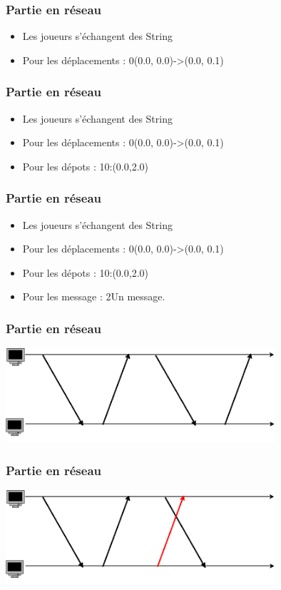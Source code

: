 \documentclass{beamer}
\begin{document}
    \begin{frame}
        \frametitle{Partie en r\'eseau}
        \begin{itemize}
        \item Les joueurs s'\'echangent des String
        \item Pour les d\'eplacements : 0(0.0, 0.0)->(0.0, 0.1)
        \end{itemize}
    \end{frame}
    \begin{frame}
        \frametitle{Partie en r\'eseau}
        \begin{itemize}
        \item Les joueurs s'\'echangent des String
        \item Pour les d\'eplacements : 0(0.0, 0.0)->(0.0, 0.1)
        \item Pour les d\'epots : 10:(0.0,2.0)
        \end{itemize}
    \end{frame}
    \begin{frame}
        \frametitle{Partie en r\'eseau}
        \begin{itemize}
        \item Les joueurs s'\'echangent des String
        \item Pour les d\'eplacements : 0(0.0, 0.0)->(0.0, 0.1)
        \item Pour les d\'epots : 10:(0.0,2.0)
        \item Pour les message : 2Un message.
        \end{itemize}
    \end{frame}
    \begin{frame}
        \frametitle{Partie en r\'eseau}
        \includegraphics[width=10cm]{echangeOK.png}
    \end{frame}
    \begin{frame}
        \frametitle{Partie en r\'eseau}
        \includegraphics[width=10cm]{echangeBUG.png}
    \end{frame}
\end{document}
